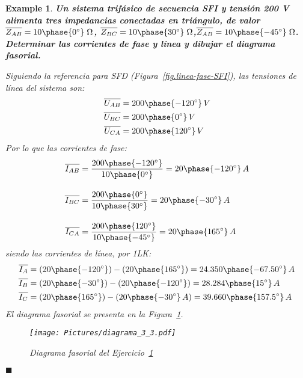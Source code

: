 \documentclass[11pt]{book} %
\numberwithin{dummy}{section}
\theoremstyle{ocrenumbox}
\theoremstyle{blacknumex}
\newtheorem{exampleT}{Example}[chapter]
\theoremstyle{blacknumbox}
\theoremstyle{ocrenum}
\newenvironment{example}{\begin{exampleT}}{\hfill{\tiny\ensuremath{\blacksquare}}\end{exampleT}}
\begin{document}
	\vspace{4mm}
	\begin{example}\label{ej.3-3}
	    \textbf{Un sistema trifásico de secuencia SFI y tensión 200 V alimenta tres impedancias conectadas en triángulo, de valor $\overline{Z_{AB}}=10\phase{0^\circ}\;\Omega$, $\overline{Z_{BC}}=10\phase{30^\circ}\;\Omega$,$\overline{Z_{AB}}=10\phase{-45^\circ}\;\Omega$. Determinar las corrientes de fase y línea y dibujar el diagrama fasorial.}
	    
	    Siguiendo la referencia para SFD (Figura~\ref{fig.linea-fase-SFI}), las tensiones de línea del sistema son:
	    \begin{align*}
	        \overline{U_{AB}}&=200\phase{-120^\circ}\,V\\
	        \overline{U_{BC}}&=200\phase{0^\circ}\,V\\
	        \overline{U_{CA}}&=200\phase{120^\circ}\,V
	    \end{align*}
	    Por lo que las corrientes de fase:
	    \begin{align*}
	        \overline{I_{AB}} &= \frac{200\phase{-120^\circ}}{10\phase{0^\circ}} =20\phase{-120^\circ} \,A \\[10pt]
          \overline{I_{BC}} &= \frac{200\phase{0^\circ}}{10\phase{30^\circ}} = 20\phase{-30^\circ} \,A\\[10pt]
          \overline{I_{CA}} &=\frac{200\phase{120^\circ}}{10\phase{-45^\circ}} = 20\phase{165^\circ} \,A
	    \end{align*}
	    siendo las corrientes de línea, por 1LK:
	    \begin{align*}
	     \overline{I_A}&=(20\phase{-120^\circ})-(20\phase{165^\circ})=24.350\phase{-67.50^\circ}\,A\\	        \overline{I_B}&=(20\phase{-30^\circ})-(20\phase{-120^\circ})=28.284\phase{15^\circ}\,A\\
	    \overline{I_C}&=(20\phase{165^\circ})-(20\phase{-30^\circ} \,A)=39.660\phase{157.5^\circ}\,A
	    \end{align*}
	    El diagrama fasorial se presenta en la Figura~\ref{fig.diagrama_ejemplo_3-3}. 
	    \begin{figure}
	        \centering
	        \texttt{[image: Pictures/diagrama\_3\_3.pdf]}
	        \caption{Diagrama fasorial del Ejercicio~\ref{ej.3-3}}
	       \label{fig.diagrama_ejemplo_3-3}
	    \end{figure}
	\end{example}
	
	
\end{document}
